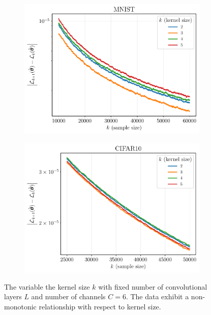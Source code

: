 \documentclass[conference]{IEEEtran}
\begin{document}
\begin{figure}[ht]
  \begin{subfigure}[b]{0.5\linewidth}
    \centering
    \includegraphics[width=\linewidth]{isp/figs/mnist_change_kers.pdf} 
  \end{subfigure}%
  \begin{subfigure}[b]{0.5\linewidth}
    \centering
    \includegraphics[width=\linewidth]{isp/figs/cifar10_change_kers.pdf} 
  \end{subfigure} 
  \caption{The variable the kernel size $k$ with fixed number of convolutional layers $L$ and number of channels $C = 6$. The data exhibit a non-monotonic relationship with respect to kernel size. }
   \label{fig:kernels}
\end{figure}
\end{document}

